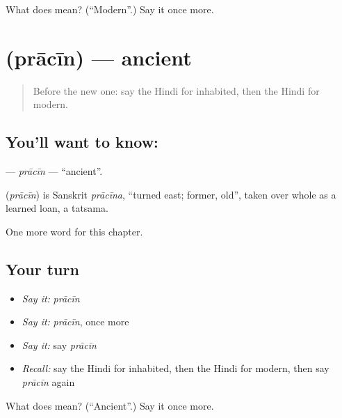 \begin{tcolorbox}[breakable,colback=teal!4,colframe=teal!35!black,title={Before you move on}]
What does  mean? (\textquotedblleft{}Modern\textquotedblright{}.) Say it once more.
\end{tcolorbox}
\section[\texorpdfstring{\hi{प्राचीन} (prācīn)}{प्राचीन (prācīn)}]{ (prācīn) — ancient}

\label{lesson:HI-C240-pracin}



\begin{quote}
Before the new one: say the Hindi for inhabited, then the Hindi for modern.
\end{quote}

\subsection*{You'll want to know: }
\textbf{} — \emph{prācīn} — \textquotedblleft{}ancient\textquotedblright{}.

\begin{cousinweb}
\textbf{} (\emph{prācīn}) is Sanskrit \emph{prācīna}, \textquotedblleft{}turned east; former, old\textquotedblright{}, taken over whole as a learned loan, a tatsama.
\end{cousinweb}

\begin{grammarlens}[title={What you've built}]
One more word for this chapter.
\end{grammarlens}

\subsection*{Your turn}
\begin{itemize}
\raggedright
  \item \emph{Say it:} \emph{prācīn}
  \item \emph{Say it:} \emph{prācīn}, once more
  \item \emph{Say it:} say \emph{prācīn}
  \item \emph{Recall:} say the Hindi for inhabited, then the Hindi for modern, then say \emph{prācīn} again
\end{itemize}

\begin{tcolorbox}[breakable,colback=teal!4,colframe=teal!35!black,title={Before you move on}]
What does  mean? (\textquotedblleft{}Ancient\textquotedblright{}.) Say it once more.
\end{tcolorbox}
